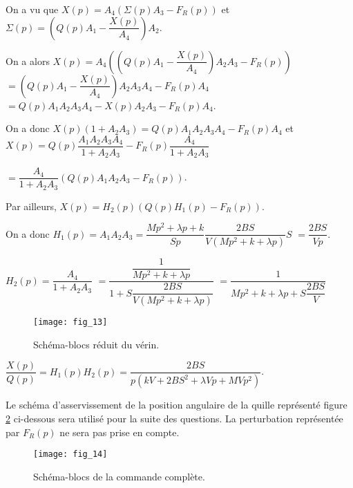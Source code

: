 \begin{corrige}
On a vu que $X(p) = A_4 \left( \Sigma(p) A_3 -F_R(p) \right)$ et $\Sigma(p) = \left(Q(p) A_1 - \dfrac{X(p)}{A_4}\right)A_2$. 

On a alors  $X(p) = A_4 \left( \left(Q(p) A_1 - \dfrac{X(p)}{A_4}\right)A_2 A_3 -F_R(p) \right)$
$=  \left(Q(p) A_1 - \dfrac{X(p)}{A_4}\right)A_2 A_3A_4 -F_R(p) A_4$ 
$=  Q(p) A_1A_2 A_3A_4  - X(p)A_2 A_3-F_R(p) A_4$.

On a donc $X(p) \left(1+A_2 A_3\right) =Q(p) A_1A_2 A_3A_4  -F_R(p) A_4$ et 
$X(p)  =Q(p) \dfrac{A_1A_2 A_3A_4}{1+A_2 A_3}  -F_R(p) \dfrac{A_4}{1+A_2 A_3} $

$=\dfrac{A_4}{1+A_2 A_3}\left( Q(p) {A_1A_2 A_3}  -F_R(p)  \right)$.

Par ailleurs, $X(p)= H_2(p) \left(Q(p) H_1(p) - F_R(p)\right)$.

On a donc $H_1(p)=A_1A_2 A_3 =  \dfrac{M p^2 + \lambda p+k}{ Sp}\dfrac{2BS}{V\left( M p^2 +k+ \lambda p\right)} S$ 
$ =  \dfrac{2BS}{Vp} $.

$H_2(p)  = \dfrac{A_4}{1+A_2 A_3}$ $=\dfrac{\dfrac{1}{M p^2 +k+ \lambda p}}{1+S\dfrac{2BS}{V\left( M p^2 +k+ \lambda p\right)}}$
$=\dfrac{1}{M p^2 +k+ \lambda p+S\dfrac{2BS}{V}}$

\end{corrige}
\else
\fi


\ifprof
\else

\begin{figure}[!h]
\centering
\texttt{[image: fig\_13]}
\caption{Schéma-blocs réduit du vérin. \label{fig_13_quille}}
\end{figure}
\fi


\ifprof
\begin{corrige}
$\dfrac{X(p)}{Q(p)} = H_1(p)H_2(p) = \dfrac{2BS}{p\left(kV + 2BS^2 + \lambda V p + MVp^2\right)}$.
\end{corrige}
\else
\fi


\ifprof
\else
Le schéma d’asservissement de la position angulaire de la quille représenté figure \ref{fig_14_quille} ci-dessous sera utilisé pour la suite des questions. La perturbation représentée par $F_R(p)$ ne sera pas prise en compte.

\begin{figure}[!h]
\centering
\texttt{[image: fig\_14]}
\caption{Schéma-blocs de la commande complète. \label{fig_14_quille}}
\end{figure}


